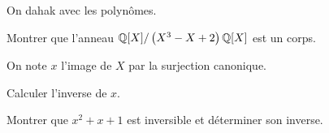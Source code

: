 \documentclass{report}
\begin{document}
\begin{exo}
    On dahak avec les polynômes.
    \begin{q}{1}
        Montrer que l'anneau \(\mathbb{Q}[X]/\left(X^3-X+2\right)\mathbb{Q}[X]\) est un corps.
    \end{q}
    On note \(x\) l'image de \(X\) par la surjection canonique.
    \begin{q}{2}
        Calculer l'inverse de \(x\).
    \end{q}
    \begin{q}{3}
        Montrer que \(x^2+x+1\) est inversible et déterminer son inverse.
    \end{q}
\end{exo}
\end{document}
